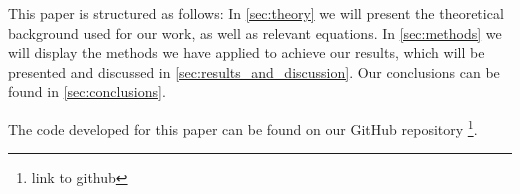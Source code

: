  
 This paper is structured as follows: In \autoref{sec:theory} we will present the theoretical background used for our work, as well as relevant equations. In \autoref{sec:methods} we will display the methods we have applied to achieve our results, which will be presented and discussed in \autoref{sec:results_and_discussion}. Our conclusions can be found in \autoref{sec:conclusions}.  

 

 
 The code developed for this paper can be found on our GitHub repository \footnote{link to github}.